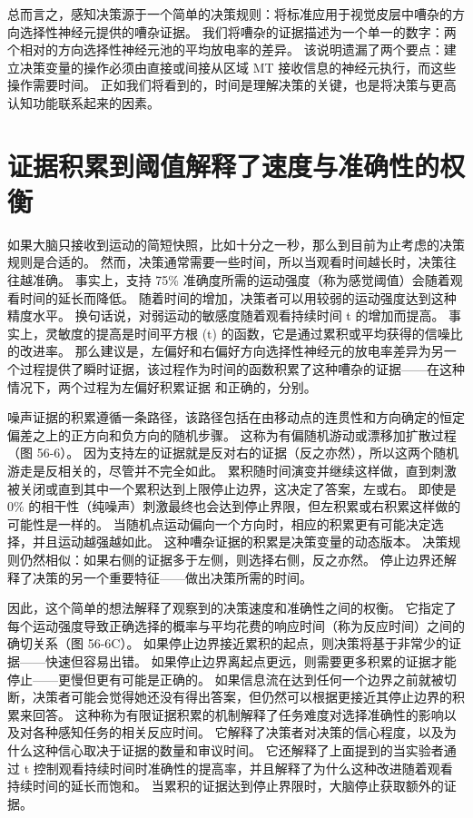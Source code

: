 总而言之，感知决策源于一个简单的决策规则：将标准应用于视觉皮层中嘈杂的方向选择性神经元提供的嘈杂证据。 我们将嘈杂的证据描述为一个单一的数字：两个相对的方向选择性神经元池的平均放电率的差异。 该说明遗漏了两个要点：建立决策变量的操作必须由直接或间接从区域 MT 接收信息的神经元执行，而这些操作需要时间。 正如我们将看到的，时间是理解决策的关键，也是将决策与更高认知功能联系起来的因素。

\section{证据积累到阈值解释了速度与准确性的权衡}

如果大脑只接收到运动的简短快照，比如十分之一秒，那么到目前为止考虑的决策规则是合适的。 然而，决策通常需要一些时间，所以当观看时间越长时，决策往往越准确。 事实上，支持 75\% 准确度所需的运动强度（称为感觉阈值）会随着观看时间的延长而降低。 随着时间的增加，决策者可以用较弱的运动强度达到这种精度水平。 换句话说，对弱运动的敏感度随着观看持续时间 t 的增加而提高。 事实上，灵敏度的提高是时间平方根 (t) 的函数，它是通过累积或平均获得的信噪比的改进率。 那么建议是，左偏好和右偏好方向选择性神经元的放电率差异为另一个过程提供了瞬时证据，该过程作为时间的函数积累了这种嘈杂的证据——在这种情况下，两个过程为左偏好积累证据 和正确的，分别。

噪声证据的积累遵循一条路径，该路径包括在由移动点的连贯性和方向确定的恒定偏差之上的正方向和负方向的随机步骤。 这称为有偏随机游动或漂移加扩散过程（图 56-6）。 因为支持左的证据就是反对右的证据（反之亦然），所以这两个随机游走是反相关的，尽管并不完全如此。 累积随时间演变并继续这样做，直到刺激被关闭或直到其中一个累积达到上限停止边界，这决定了答案，左或右。 即使是 0\% 的相干性（纯噪声）刺激最终也会达到停止界限，但左积累或右积累这样做的可能性是一样的。 当随机点运动偏向一个方向时，相应的积累更有可能决定选择，并且运动越强越如此。 这种嘈杂证据的积累是决策变量的动态版本。 决策规则仍然相似：如果右侧的证据多于左侧，则选择右侧，反之亦然。 停止边界还解释了决策的另一个重要特征——做出决策所需的时间。

因此，这个简单的想法解释了观察到的决策速度和准确性之间的权衡。 它指定了每个运动强度导致正确选择的概率与平均花费的响应时间（称为反应时间）之间的确切关系（图 56-6C）。 如果停止边界接近累积的起点，则决策将基于非常少的证据——快速但容易出错。 如果停止边界离起点更远，则需要更多积累的证据才能停止——更慢但更有可能是正确的。 如果信息流在达到任何一个边界之前就被切断，决策者可能会觉得她还没有得出答案，但仍然可以根据更接近其停止边界的积累来回答。 这种称为有限证据积累的机制解释了任务难度对选择准确性的影响以及对各种感知任务的相关反应时间。 它解释了决策者对决策的信心程度，以及为什么这种信心取决于证据的数量和审议时间。 它还解释了上面提到的当实验者通过 t 控制观看持续时间时准确性的提高率，并且解释了为什么这种改进随着观看持续时间的延长而饱和。 当累积的证据达到停止界限时，大脑停止获取额外的证据。


